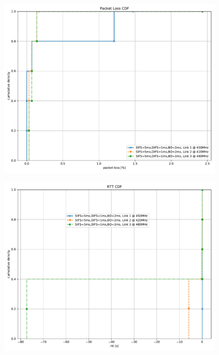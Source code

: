 \documentclass{article}
\begin{document}
\begin{figure}
	\includegraphics[width=\textwidth]{rb_low_single/cdf/packet_loss_cdf}
\end{figure}

\begin{figure}
	\includegraphics[width=\textwidth]{rb_low_single/cdf/rtt_cdf}
\end{figure}
\end{document}

